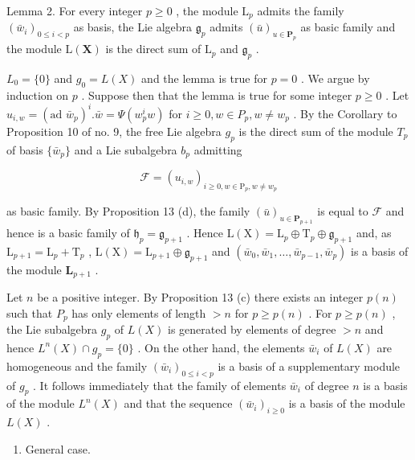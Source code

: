 Lemma 2. For every integer \(p \geqslant 0\) , the module \(\mathrm{L}_p\) admits the family \((\bar{w}_i)_{0 \leqslant i < p}\) as basis, the Lie algebra \(\mathfrak{g}_p\) admits \((\bar{u})_{u \in \mathbf{P}_p}\) as basic family and the module \(\mathrm{L}(\mathbf{X})\) is the direct sum of \(\mathrm{L}_p\) and \(\mathfrak{g}_p\) .

\(L_{0} = \{0\}\) and \(g_{0} = L(X)\) and the lemma is true for \(p = 0\) . We argue by induction on \(p\) . Suppose then that the lemma is true for some integer \(p \geqslant 0\) . Let \(u_{i,w} = (\text{ad } \bar{w}_{p})^{i}. \bar{w} = \Psi(w_{p}^{i} w)\) for \(i \geqslant 0, w \in P_{p}, w \neq w_{p}\) . By the Corollary to Proposition 10 of no. 9, the free Lie algebra \(g_{p}\) is the direct sum of the module \(T_{p}\) of basis \(\{\bar{w}_{p}\}\) and a Lie subalgebra \(b_{p}\) admitting

\[
\mathcal {F} = (u _ {i, w}) _ {i \geqslant 0, w \in \mathrm{P} _ {p}, w \neq w _ {p}}
\]

as basic family. By Proposition 13 (d), the family \((\bar{u})_{u\in \mathbf{P}_{p + 1}}\) is equal to \(\mathcal{F}\) and hence is a basic family of \(\mathfrak{h}_p = \mathfrak{g}_{p + 1}\) . Hence \(\mathrm{L}(\mathrm{X}) = \mathrm{L}_p\oplus \mathrm{T}_p\oplus \mathfrak{g}_{p + 1}\) and, as \(\mathrm{L}_{p + 1} = \mathrm{L}_p + \mathrm{T}_p\) , \(\mathrm{L}(\mathrm{X}) = \mathrm{L}_{p + 1}\oplus \mathfrak{g}_{p + 1}\) and \((\bar{w}_0,\bar{w}_1,\dots ,\bar{w}_{p - 1},\bar{w}_p)\) is a basis of the module \(\mathbf{L}_{p + 1}\) .

Let \(n\) be a positive integer. By Proposition 13 (c) there exists an integer \(p(n)\) such that \(P_p\) has only elements of length \(>n\) for \(p \geqslant p(n)\) . For \(p \geqslant p(n)\) , the Lie subalgebra \(g_p\) of \(L(X)\) is generated by elements of degree \(>n\) and hence \(L^n(X) \cap g_p = \{0\}\) . On the other hand, the elements \(\bar{w}_i\) of \(L(X)\) are homogeneous and the family \((\bar{w}_i)_{0 \leqslant i < p}\) is a basis of a supplementary module of \(g_p\) . It follows immediately that the family of elements \(\bar{w}_i\) of degree \(n\) is a basis of the module \(L^n(X)\) and that the sequence \((\bar{w}_i)_{i \geqslant 0}\) is a basis of the module \(L(X)\) .

\begin{enumerate}
\def\labelenumi{(\Alph{enumi})}
\setcounter{enumi}{1}
\tightlist
\item
  General case.
\end{enumerate}

